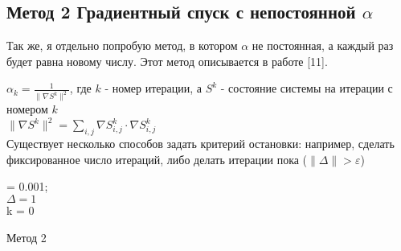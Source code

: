 \documentclass[ 12pt,x11names]{article}
\begin{document}
    \subsection{Метод 2 Градиентный спуск с непостоянной $\alpha$}
    Так же, я  отдельно попробую метод, в котором  $\alpha$ не постоянная, а каждый раз будет равна новому числу. Этот метод описывается в работе [11].\\
    \begin{comment}
     $\alpha_k  = \frac{\| \nabla S^k \|^2}{\| \nabla S^{k-1} \|^2}$,
     \end{comment}
     $\alpha_k  = \frac{1}{\| \nabla S^k \|^2}$, где $k$ - номер итерации, а $S^k$ - состояние системы на итерации с номером $k$\\
     $\| \nabla S^k \|^2  = \displaystyle{\sum_{i, j}}  \nabla S^k_{i,j} \cdot  \nabla S^k_{i,j}$\\
    Существует несколько способов задать критерий остановки: например, сделать фиксированное число итераций, либо делать итерации пока  ($\| \Delta \|> \varepsilon$)\\
    \begin{comment}
		     $\alpha  = \frac{\| \nabla S^k \|^2}{\| \nabla S^{k-1} \|^2}$\\
    \end{comment}
    \begin{algorithm}[H]
		\SetAlgoLined
		\alpha = 0.001;\\
		$ \Delta  = 1$\\
		k = 0\\
	\caption{Метод 2}
    \end{algorithm}
\end{document}
